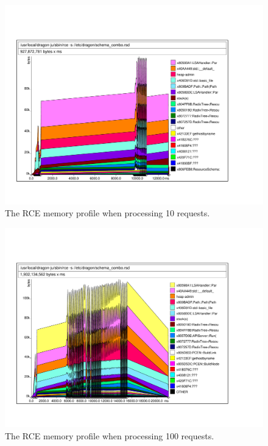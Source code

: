\documentclass[10pt,a4paper]{report}
\begin{document}
\begin{figure}[!htbp]
  \begin{center}
    \includegraphics[angle=270,scale=0.70]{img/multi-10}
    \caption[RCE memory profile (10 requests)]{The RCE memory profile
      when processing 10 requests.}
    \label{fig:multi-10}
  \end{center}
\end{figure}

\begin{figure}[!htbp]
  \begin{center}
    \includegraphics[angle=270,scale=0.70]{img/multi-100}
    \caption[RCE memory profile (100 requests)]{The RCE memory profile
      when processing 100 requests.}
    \label{fig:multi-100}
  \end{center}
\end{figure}
\end{document}
